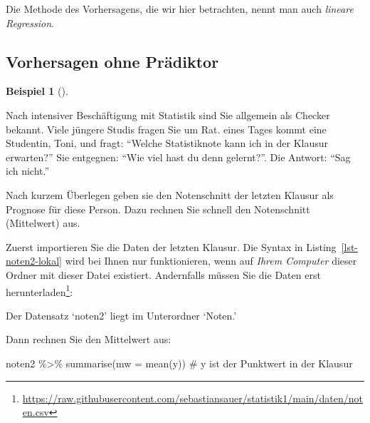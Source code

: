 \documentclass[
  a4paper,
]{scrbook}
\newenvironment{Shaded}{\begin{snugshade}}{\end{snugshade}}
\newcommand{\AttributeTok}[1]{\textcolor[rgb]{0.40,0.45,0.13}{#1}}
\newcommand{\CommentTok}[1]{\textcolor[rgb]{0.37,0.37,0.37}{#1}}
\newcommand{\FunctionTok}[1]{\textcolor[rgb]{0.28,0.35,0.67}{#1}}
\newcommand{\NormalTok}[1]{\textcolor[rgb]{0.00,0.23,0.31}{#1}}
\newcommand{\OtherTok}[1]{\textcolor[rgb]{0.00,0.23,0.31}{#1}}
\newcommand{\SpecialCharTok}[1]{\textcolor[rgb]{0.37,0.37,0.37}{#1}}
\newcommand{\StringTok}[1]{\textcolor[rgb]{0.13,0.47,0.30}{#1}}
\theoremstyle{definition}
\newtheorem{example}{Beispiel}[chapter]
\theoremstyle{definition}
\theoremstyle{definition}
\theoremstyle{remark}
\begin{document}
Die Methode des Vorhersagens, die wir hier betrachten, nennt man auch
\emph{lineare Regression}.

\subsection{Vorhersagen ohne
Prädiktor}\label{vorhersagen-ohne-pruxe4diktor}

\begin{example}[]\protect\hypertarget{exm-noten-prognose}{}\label{exm-noten-prognose}

Nach intensiver Beschäftigung mit Statistik sind Sie allgemein als
Checker bekannt. Viele jüngere Studis fragen Sie um Rat. eines Tages
kommt eine Studentin, Toni, und fragt: ``Welche Statistiknote kann ich
in der Klausur erwarten?'' Sie entgegnen: ``Wie viel hast du denn
gelernt?''. Die Antwort: ``Sag ich nicht.''

Nach kurzem Überlegen geben sie den Notenschnitt der letzten Klausur als
Prognose für diese Person. Dazu rechnen Sie schnell den Notenschnitt
(Mittelwert) aus.

Zuerst importieren Sie die Daten der letzten Klausur. Die Syntax in
Listing~\ref{lst-noten2-lokal} wird bei Ihnen nur funktionieren, wenn
auf \emph{Ihrem Computer} dieser Ordner mit dieser Datei existiert.
Andernfalls müssen Sie die Daten erst herunterladen\footnote{\url{https://raw.githubusercontent.com/sebastiansauer/statistik1/main/daten/noten.csv}}:

\begin{codelisting}

\caption{\label{lst-noten2-lokal}Der Datensatz `noten2' liegt im
Unterordner `Noten.'}

\centering{

\begin{Shaded}
\begin{Highlighting}[]
\NormalTok{noten2 }\OtherTok{\textless{}{-}} \FunctionTok{read.csv}\NormalTok{(}\StringTok{"daten/noten2.csv"}\NormalTok{)}
\end{Highlighting}
\end{Shaded}

}

\end{codelisting}%

Dann rechnen Sie den Mittelwert aus:

\begin{Shaded}
\begin{Highlighting}[]
\NormalTok{noten2 }\SpecialCharTok{\%\textgreater{}\%} 
  \FunctionTok{summarise}\NormalTok{(}\AttributeTok{mw =} \FunctionTok{mean}\NormalTok{(y))  }\CommentTok{\# y ist der Punktwert in der Klausur}
\end{Highlighting}
\end{Shaded}


\end{example}
\end{document}
